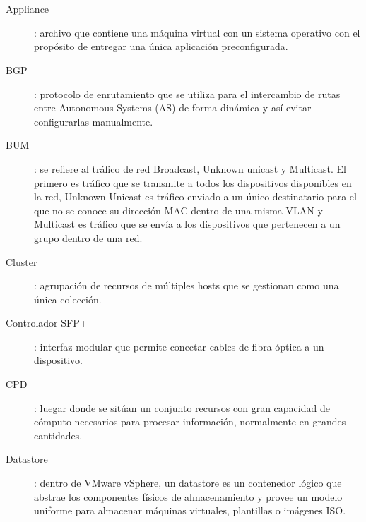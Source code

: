 \chapter*{\nomeglosariotermos}
\label{chap:glosario-termos}


\begin{description}
   \item [Appliance]: archivo que contiene una máquina virtual con un sistema operativo con el propósito de entregar una única aplicación preconfigurada.
   \label{itm:appliance}
   \item [BGP]\cite{bgp}: protocolo de enrutamiento que se utiliza para el intercambio de rutas entre Autonomous Systems (AS) de forma dinámica y así evitar configurarlas manualmente.
   \label{itm:bgp}
   \item [BUM]: se refiere al tráfico de red Broadcast, Unknown unicast y Multicast. El primero es tráfico que se transmite a todos los dispositivos disponibles en la red, Unknown Unicast es tráfico enviado a un único destinatario para el que no se conoce su dirección MAC dentro de una misma VLAN y Multicast es tráfico que se envía a los dispositivos que pertenecen a un grupo dentro de una red.
   \label{itm:bum}
   \item [Cluster]\cite{cluster-vmware}: agrupación de recursos de múltiples hosts que se gestionan como una única colección.
   \label{itm:cluster}
   \item [Controlador SFP+]: interfaz modular que permite conectar cables de fibra óptica a un dispositivo.
   \label{itm:sfp}   
  \item [CPD]: luegar donde se sitúan un conjunto recursos con gran capacidad de cómputo necesarios para procesar información, normalmente en grandes cantidades.
  \label{itm:cpd}
  \item [Datastore]: dentro de VMware vSphere, un datastore es un contenedor lógico que abstrae los componentes físicos de almacenamiento y provee un modelo uniforme para almacenar máquinas virtuales, plantillas o imágenes ISO.

\end{description}
